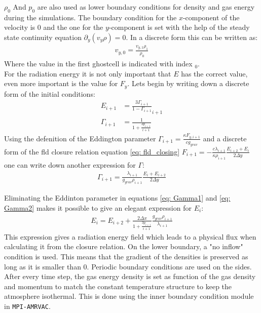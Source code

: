 $\rho_0$ And $p_0$ are also used as lower boundary conditions for density and gas energy during the simulations. The  boundary condition for the $x$-component of the velocity is $0$ and the one for the $y$-component is set with the help of the steady state continuity equation $\partial_y(v_y \rho) = 0$. In a discrete form this can be written as:
\begin{align}
v_{y,0} = \frac{v_{y,1} \rho_1}{\rho_0}
\end{align}
Where the value in the first ghostcell is indicated with index $_0$.\\
For the radiation energy it is not only important that $E$ has the correct value, even more important is the value for $F_y$. Lets begin by writing down a discrete form of the initial conditions:
\begin{align}
E_{i+1} &= \frac{3 \Gamma_{i+1}}{1-\Gamma_{i+1}}_{i+1} \\
\Gamma_{i+1} &= \frac{1}{1 + \frac{3 p_{i+1}}{i+1}} \label{eq: Gamma1}
\end{align}
Using the defenition of the Eddington parameter $\Gamma_{i+1} = \frac{\kappa F_{y,i+1}}{c g_{grav}}$ and a discrete form of the fld closure relation equation \eqref{eq: fld_closing} $F_{i+1} = -\frac{c \lambda_{i+1}}{\kappa \rho_{i+1}} \frac{E_{i+2} + E_{i}}{2 \Delta y}$ one can write down another expression for $\Gamma$:
\begin{align}
\Gamma_{i+1} = \frac{\lambda_{i+1}}{g_{grav}\rho_{i+1}}\frac{E_i + E_{i+2}}{2 \Delta y} \label{eq: Gamma2}
\end{align}

Eliminating the Eddinton parameter in equations \ref{eq: Gamma1} and \eqref{eq: Gamma2} makes it possible to give an elegant expression for $E_i$:
\begin{align}
E_i = E_{i+2} + \frac{2 \Delta x}{1 + \frac{3 p_{i+1}}{i+1}}  \frac{g_{grav} \rho_{i+1}}{\lambda_{i+1}}  
\end{align}
This expression gives a radiation energy field which leads to a physical flux when calculating it from the closure relation. On the lower boundary, a "no inflow" condition is used. This means that the gradient of the densities is preserved as long as it is smaller than $0$. Periodic boundary conditions are used on the sides. \\ 

After every time step, the gas energy density is set as function of the gas density and momentum to match the constant temperature structure to keep the atmosphere isothermal. This is done using the inner boundary condition module in \texttt{MPI-AMRVAC}.\\

